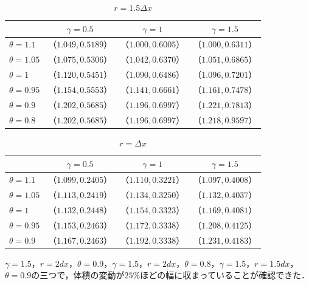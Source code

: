 \documentclass[a4j,12pt]{jreport}
\begin{document}
\begin{table}[H]
    \centering
    \caption{$r = 1.5\varDelta x$} \label{table:r15dx}
    \begin{tabular}{|l|c|c|c|} 
    \hline
                			 	& $\gamma = 0.5$	 	& $\gamma =1$ 	 & $\gamma =1.5$ 		\\\hline\hline
     $\theta = 1.1$        & $（1.049,0.5189）$ & $（1.000,0.6005）$ & $（1.000,0.6311）$			\\
     $\theta = 1.05$      & $（1.075,0.5306）$ & $（1.042,0.6370）$ & $（1.051,0.6865）$                  \\
     $\theta = 1$   	 & $（1.120,0.5451）$ & $（1.090,0.6486）$ & $（1.096,0.7201）$         \\
     $\theta = 0.95$      & $（1.154,0.5553）$ & $（1.141,0.6661）$ & $（1.161,0.7478）$ \\
     $\theta = 0.9$  	 & $（1.202,0.5685）$ & $（1.196,0.6997）$ & $（1.221,0.7813）$                     \\
     $\theta = 0.8$  	 & $（1.202,0.5685）$ & $（1.196,0.6997）$ & $（1.218,0.9597）$                \\
      \hline
    \end{tabular}
  \end{table}
  
\begin{table}[H]
    \centering
    \caption{$r = \varDelta x$} \label{table:r1dx}
    \begin{tabular}{|l|c|c|c|} 
    \hline
                			 	& $\gamma = 0.5$	   & $\gamma =1$ 	 & $\gamma =1.5$ 		\\\hline\hline
     $\theta = 1.1$        & $（1.099,0.2405）$ & $（1.110,0.3221）$ & $（1.097,0.4008）$			\\
     $\theta = 1.05$      & $（1.113,0.2419）$ & $（1.134,0.3250）$ & $（1.132,0.4037）$                  \\
     $\theta = 1$   	 & $（1.132,0.2448）$ & $（1.154,0.3323）$ & $（1.169,0.4081）$         \\
     $\theta = 0.95$      & $（1.153,0.2463）$ & $（1.172,0.3338）$ & $（1.208,0.4125）$ \\
     $\theta = 0.9$  	 & $（1.167,0.2463）$ & $（1.192,0.3338）$ & $（1.231,0.4183）$                     \\ \hline
    \end{tabular}
  \end{table}
$\gamma = 1.5$，$r = 2dx$，$\theta = 0.9$，$\gamma = 1.5$，$r = 2dx$，$\theta = 0.8$，$\gamma = 1.5$，$r = 1.5dx$，$\theta = 0.9$の三つで，体積の変動が$25\%$ほどの幅に収まっていることが確認できた．
\end{document}
